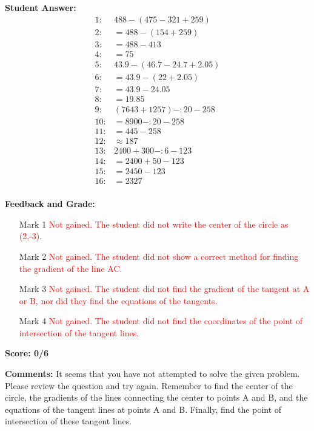 \documentclass{article}
\begin{document}
\textbf{Student Answer:}
\begin{align*}
1: & 488-(475-321+259) \\
2: & =488-(154+259) \\
3: & =488-413 \\
4: & =75 \\
5: & 43.9-(46.7-24.7+2.05) \\
6: & =43.9-(22+2.05) \\
7: & =43.9-24.05 \\
8: & =19.85 \\
9: & (7643+1257)-:20-258 \\
10: & =8900-:20-258 \\
11: & =445-258 \\
12: & \approx 187 \\
13: & 2400+300-:6-123 \\
14: & =2400+50-123 \\
15: & =2450-123 \\
16: & =2327 \\
\end{align*}

\textbf{Feedback and Grade:}
\begin{itemize}
\item[Mark 1] \textcolor{red}{Not gained. The student did not write the center of the circle as (2,-3).}
\item[Mark 2] \textcolor{red}{Not gained. The student did not show a correct method for finding the gradient of the line AC.}
\item[Mark 3] \textcolor{red}{Not gained. The student did not find the gradient of the tangent at A or B, nor did they find the equations of the tangents.}
\item[Mark 4] \textcolor{red}{Not gained. The student did not find the coordinates of the point of intersection of the tangent lines.}
\end{itemize}

\textbf{Score: 0/6}

\textbf{Comments:} It seems that you have not attempted to solve the given problem. Please review the question and try again. Remember to find the center of the circle, the gradients of the lines connecting the center to points A and B, and the equations of the tangent lines at points A and B. Finally, find the point of intersection of these tangent lines.
\end{document}
